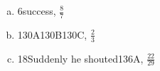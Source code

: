 \begin{Answer}[ref={packbits-rle}]

  \begin{enumerate}[(a)]
  \item 6success, $\frac{8}{7}$
  \item 130A130B130C, $\frac{2}{3}$
  \item 18Suddenly he shouted136A, $\frac{22}{29}$
  \end{enumerate}

\end{Answer}

\FloatBarrier